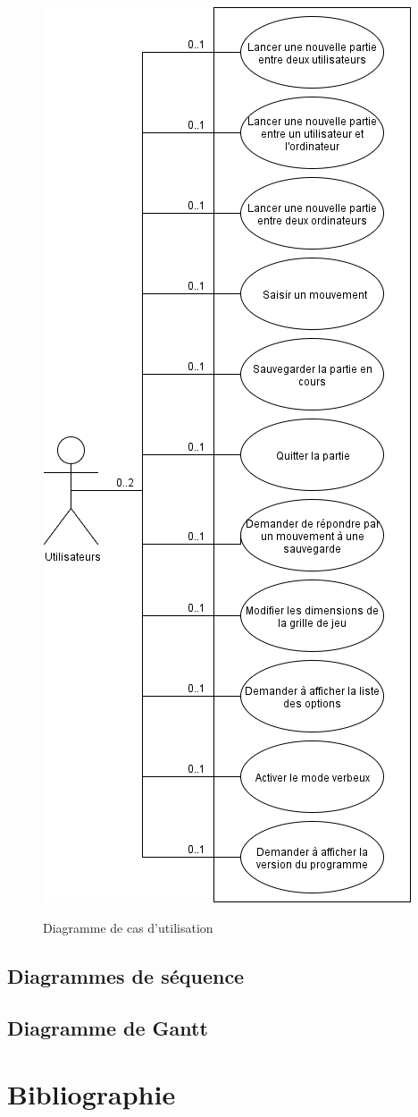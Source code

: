 \documentclass[10pt,a4paper]{article}
\begin{document}
\begin{figure}[H]
\centering
\includegraphics[scale=0.5]{images/use_case.png}
\label{use_case}
\caption{Diagramme de cas d'utilisation}
\end{figure}

\subsection{Diagrammes de séquence}

\subsection{Diagramme de Gantt}

\section{Bibliographie}
\end{document}
